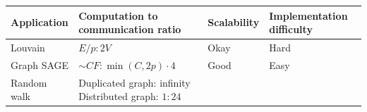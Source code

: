 \documentclass[10pt,oneside]{memoir}
\begin{document}
\begin{longtable}[]{@{}llll@{}}
\toprule
\begin{minipage}[b]{0.23\columnwidth}\raggedright
Application\strut
\end{minipage} & \begin{minipage}[b]{0.35\columnwidth}\raggedright
Computation to communication ratio\strut
\end{minipage} & \begin{minipage}[b]{0.11\columnwidth}\raggedright
Scalability\strut
\end{minipage} & \begin{minipage}[b]{0.19\columnwidth}\raggedright
Implementation difficulty\strut
\end{minipage}\tabularnewline
\midrule
\endhead
\begin{minipage}[t]{0.23\columnwidth}\raggedright
Louvain\strut
\end{minipage} & \begin{minipage}[t]{0.35\columnwidth}\raggedright
\(E/p : 2V\)\strut
\end{minipage} & \begin{minipage}[t]{0.11\columnwidth}\raggedright
Okay\strut
\end{minipage} & \begin{minipage}[t]{0.19\columnwidth}\raggedright
Hard\strut
\end{minipage}\tabularnewline
\begin{minipage}[t]{0.23\columnwidth}\raggedright
Graph SAGE\strut
\end{minipage} & \begin{minipage}[t]{0.35\columnwidth}\raggedright
\(\sim CF : \min(C, 2p) \cdot 4\)\strut
\end{minipage} & \begin{minipage}[t]{0.11\columnwidth}\raggedright
Good\strut
\end{minipage} & \begin{minipage}[t]{0.19\columnwidth}\raggedright
Easy\strut
\end{minipage}\tabularnewline
\begin{minipage}[t]{0.23\columnwidth}\raggedright
Random walk\strut
\end{minipage} & \begin{minipage}[t]{0.35\columnwidth}\raggedright
Duplicated graph: infinity \linebreak Distributed graph:
\(1 : 24\)\strut
\end{minipage} & \begin{minipage}[t]{0.11\columnwidth}\raggedright

\end{minipage}
\end{longtable}
\end{document}
